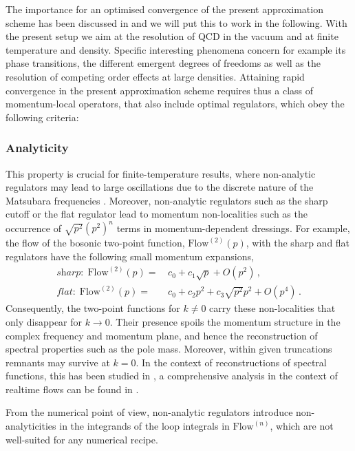 \documentclass[aps,twocolumn,prd,superscriptaddress]{revtex4-2}
\begin{document}
The importance for an optimised convergence of the present approximation scheme has been discussed in  and we will put this to work in the following. With the present setup we aim at the resolution of QCD in the vacuum and at finite temperature and density. Specific interesting phenomena concern for example its phase transitions, the different emergent degrees of freedoms as well as the resolution of competing order effects at large densities. Attaining rapid convergence in the present approximation scheme requires thus a class of momentum-local operators, that also include optimal regulators, which obey the following criteria: 


\subsubsection{Analyticity} 
\label{sec:Analyticity} 

This property is crucial for finite-temperature results, where non-analytic regulators may lead to large oscillations due to the discrete nature of the Matsubara frequencies \cite{Fister:2015eca}. Moreover, non-analytic regulators such as the sharp cutoff or the flat regulator lead to momentum non-localities such as the occurrence of $\sqrt{p^2} (p^2)^n$ terms in momentum-dependent dressings. For example, the flow of the bosonic two-point function, $\textrm{Flow}^{(2)}(p)$, with the sharp and flat regulators have the following small momentum expansions, 
%  
\begin{align} \nonumber 
 \textit{sharp:}\ \ \textrm{Flow}^{(2)}(p) = &\, c_0 + c_1 \sqrt{p} +O(p^2)\,,\\[1ex]
\textit{flat:}\ \ \textrm{Flow}^{(2)}(p) = &\, c_0 + c_2 p^2 +c_3 \sqrt{p^2} p^2+ O(p^4)\,. 
\end{align}
%
Consequently, the two-point functions for $k\neq 0$ carry these non-localities that only disappear for $k\to 0$. Their presence spoils the momentum structure in the complex frequency and momentum plane, and hence the reconstruction of spectral properties such as the pole mass. Moreover, within given truncations remnants may survive at $k=0$. In the context of reconstructions of spectral functions, this has been studied in \cite{Bonanno:2021squ}, a comprehensive analysis in the context of realtime flows can be found in \cite{Braun:2022mgx}. 

From the numerical point of view, non-analytic regulators introduce non-analyticities in the integrands of the loop integrals in $\textrm{Flow}^{(n)}$, which are not well-suited for any numerical recipe. 
\end{document}
